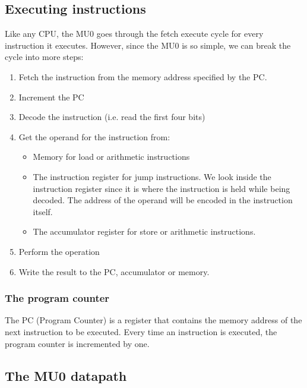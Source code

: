 \documentclass{article}
\begin{document}
\subsection{Executing instructions}

Like any CPU, the MU0 goes through the fetch execute cycle for every instruction
it executes. However, since the MU0 is so simple, we can break the cycle into
more steps:

\begin{enumerate}

	\item Fetch the instruction from the memory address specified by the PC.

	\item Increment the PC

	\item Decode the instruction (i.e. read the first four bits)

	\item Get the operand for the instruction from:
		\begin{itemize}
			\item Memory for load or arithmetic instructions
			\item The instruction register for jump instructions. We look inside
			the instruction register since it is where the instruction is held
			while being decoded. The address of the operand will be encoded in
			the instruction itself.
			\item The accumulator register for store or arithmetic instructions.
		\end{itemize}

	\item Perform the operation

	\item Write the result to the PC, accumulator or memory.
\end{enumerate}

\subsubsection{The program counter}

The PC (Program Counter) is a register that contains the memory address of the
next instruction to be executed. Every time an instruction is executed, the
program counter is incremented by one.

\subsection{The MU0 datapath}
\end{document}
